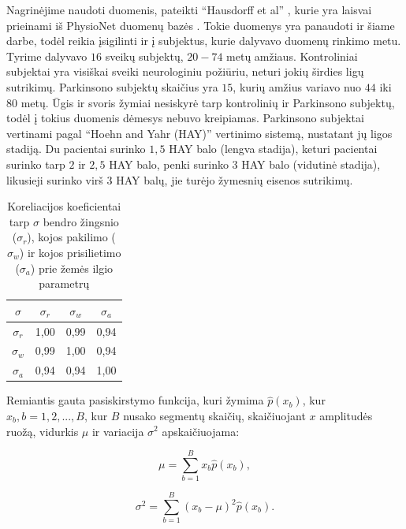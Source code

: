 \documentclass[]{vgtuef}
\begin{document}
Nagrinėjime naudoti duomenis, pateikti ``Hausdorff et al'' \cite{MDS:MDS870130310}, kurie yra laisvai prieinami iš PhysioNet duomenų bazės \cite{932728}. Tokie duomenys yra panaudoti ir šiame darbe, todėl reikia įsigilinti ir į subjektus, kurie dalyvavo duomenų rinkimo metu. Tyrime dalyvavo $16$ sveikų subjektų, $20-74$ metų amžiaus. Kontroliniai subjektai yra visiškai sveiki neurologiniu požiūriu, neturi jokių širdies ligų sutrikimų. Parkinsono subjektų skaičius yra $15$, kurių amžius variavo nuo $44$ iki $80$ metų. Ūgis ir svoris žymiai nesiskyrė tarp kontrolinių ir Parkinsono subjektų, todėl į tokius duomenis dėmesys nebuvo kreipiamas. Parkinsono subjektai vertinami pagal ``Hoehn and Yahr (HAY)'' vertinimo sistemą, nustatant jų ligos stadiją. Du pacientai surinko $1,5$ HAY balo (lengva stadija), keturi pacientai surinko tarp $2$ ir $2,5$ HAY balo, penki surinko $3$ HAY balo (vidutinė stadija), likusieji surinko virš $3$ HAY balų, jie turėjo žymesnių eisenos sutrikimų. 

\begin{table}[b]
  \centering
  \renewcommand{\arraystretch}{1.3}
  \caption{Koreliacijos koeficientai tarp $\sigma$ bendro žingsnio ($\sigma_r$), kojos pakilimo ($\sigma_w$) ir kojos prisilietimo ($\sigma_a$) prie žemės ilgio parametrų \cite{5280353}}
  \label{table:stance_swing_string_corr}
  \begin{tabular}{|c|c|c|c|} \hline
    $\sigma$ & $\sigma_r$ & $\sigma_w$ & $\sigma_a$ \\ \hline
    $\sigma_r$ & 1,00 & 0,99 & 0,94 \\ \hline
    $\sigma_w$ & 0,99 & 1,00 & 0,94 \\ \hline
    $\sigma_a$ & 0,94 & 0,94 & 1,00 \\ \hline
  \end{tabular}
\end{table}

Remiantis gauta pasiskirstymo funkcija, kuri žymima  $\hat{p}(x_b)$, kur $x_b, b = 1, 2, ..., B$, kur $B$ nusako segmentų skaičių, skaičiuojant $x$ amplitudės ruožą, vidurkis $\mu$ ir variacija $\sigma^2$ apskaičiuojama:

\begin{equation}
\mu = \sum_{b=1}^{B} x_b \hat{p}(x_b),
\end{equation}

\begin{equation}
\sigma^2 = \sum_{b=1}^{B} (x_b - \mu)^2 \hat{p}(x_b).
\end{equation}
\end{document}
